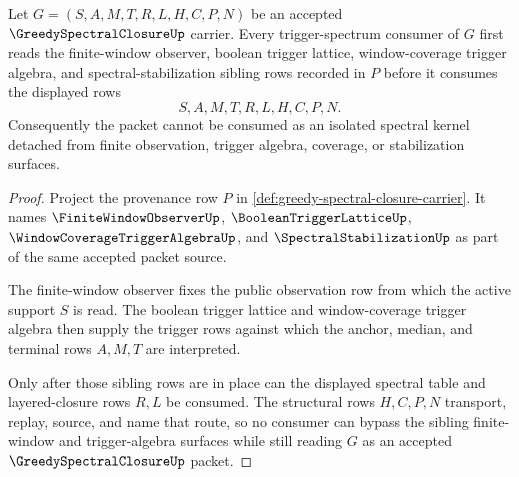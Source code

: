 \begin{theorem}
\label{thm:greedy-spectral-closure-sibling-trigger-route}
Let $G=(S,A,M,T,R,L,H,C,P,N)$ be an accepted $\GreedySpectralClosureUp$ carrier. Every trigger-spectrum consumer of $G$ first reads the finite-window observer, boolean trigger lattice, window-coverage trigger algebra, and spectral-stabilization sibling rows recorded in $P$ before it consumes the displayed rows
$$
S,A,M,T,R,L,H,C,P,N .
$$
Consequently the packet cannot be consumed as an isolated spectral kernel detached from finite observation, trigger algebra, coverage, or stabilization surfaces.
\end{theorem}
\begin{proof}
Project the provenance row $P$ in \autoref{def:greedy-spectral-closure-carrier}. It names $\FiniteWindowObserverUp$, $\BooleanTriggerLatticeUp$, $\WindowCoverageTriggerAlgebraUp$, and $\SpectralStabilizationUp$ as part of the same accepted packet source.

The finite-window observer fixes the public observation row from which the active support $S$ is read. The boolean trigger lattice and window-coverage trigger algebra then supply the trigger rows against which the anchor, median, and terminal rows $A,M,T$ are interpreted.

Only after those sibling rows are in place can the displayed spectral table and layered-closure rows $R,L$ be consumed. The structural rows $H,C,P,N$ transport, replay, source, and name that route, so no consumer can bypass the sibling finite-window and trigger-algebra surfaces while still reading $G$ as an accepted $\GreedySpectralClosureUp$ packet.
\end{proof}





